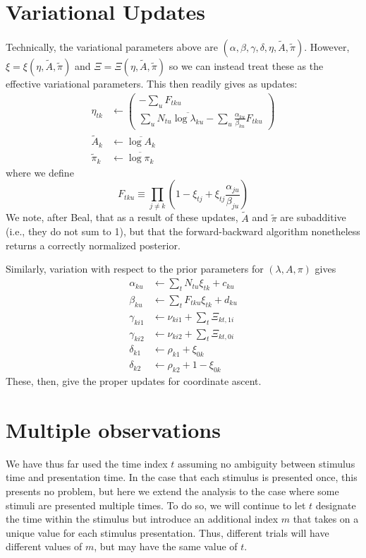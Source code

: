 \documentclass[11pt]{article}
\begin{document}
\section{Variational Updates}
Technically, the variational parameters above are $(\alpha, \beta, \gamma, \delta, \eta, \tilde{A}, \tilde{\pi})$. However, $\xi = \xi(\eta, \tilde{A}, \tilde{\pi})$ and $\Xi = \Xi(\eta, \tilde{A}, \tilde{\pi})$ so we can instead treat these as the effective variational parameters. This then readily gives as updates:
\begin{align}
    \eta_{tk} &\leftarrow
    \begin{pmatrix}
        -\sum_u F_{tku} \\
        \sum_u N_{tu} \overline{\log \lambda_{ku}} -
        \sum_u \frac{\alpha_{ku}}{\beta_{ku}} F_{tku}
    \end{pmatrix} \\
    \tilde{A}_{k} &\leftarrow \overline{\log A_k} \\
    \tilde{\pi}_k &\leftarrow \overline{\log \pi_k}
\end{align}
where we define
\begin{equation}
    F_{tku} \equiv \prod_{j \neq k} \left( 1 - \xi_{tj} + \xi_{tj} \frac{\alpha_{ju}}{\beta_{ju}}\right)
\end{equation}
We note, after Beal, that as a result of these updates, $\tilde{A}$ and $\tilde{\pi}$ are subadditive (i.e., they do not sum to 1), but that the forward-backward algorithm nonetheless returns a correctly normalized posterior.


Similarly, variation with respect to the prior parameters for $(\lambda, A, \pi)$ gives
\begin{align}
    \alpha_{ku} &\leftarrow \sum_t N_{tu} \xi_{tk} + c_{ku} \\
    \beta_{ku} &\leftarrow \sum_t F_{tku}\xi_{tk} + d_{ku} \\
    \gamma_{ki1} &\leftarrow \nu_{ki1} + \sum_t \Xi_{kt, 1i} \\
    \gamma_{ki2} &\leftarrow \nu_{ki2} + \sum_t \Xi_{kt, 0i} \\
    \delta_{k1} &\leftarrow \rho_{k1} + \xi_{0k} \\
    \delta_{k2} &\leftarrow \rho_{k2} + 1 - \xi_{0k}
\end{align}
These, then, give the proper updates for coordinate ascent.

\section{Multiple observations}
We have thus far used the time index $t$ assuming no ambiguity between stimulus time and presentation time. In the case that each stimulus is presented once, this presents no problem, but here we extend the analysis to the case where some stimuli are presented multiple times. To do so, we will continue to let $t$ designate the time within the stimulus but introduce an additional index $m$ that takes on a unique value for each stimulus presentation. Thus, different trials will have different values of $m$, but may have the same value of $t$.
\end{document}
